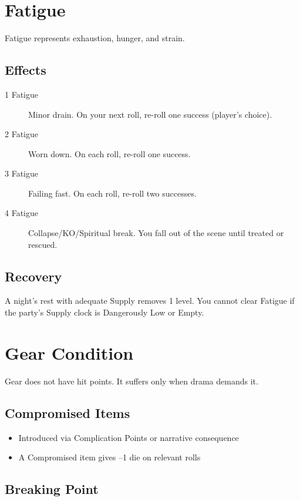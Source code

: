 \section{Fatigue}

Fatigue represents exhaustion, hunger, and strain.

\subsection{Effects}

\begin{description}
\item[1 Fatigue] Minor drain. On your next roll, re-roll one success (player's choice).
\item[2 Fatigue] Worn down. On each roll, re-roll one success.
\item[3 Fatigue] Failing fast. On each roll, re-roll two successes.
\item[4 Fatigue] Collapse/KO/Spiritual break. You fall out of the scene until treated or rescued.
\end{description}

\subsection{Recovery}

A night's rest with adequate Supply removes 1 level. You cannot clear Fatigue if the party's Supply clock is Dangerously Low or Empty.

\section{Gear Condition}

Gear does not have hit points. It suffers only when drama demands it.

\subsection{Compromised Items}

\begin{itemize}
\item Introduced via Complication Points or narrative consequence
\item A Compromised item gives --1 die on relevant rolls
\end{itemize}

\subsection{Breaking Point}

